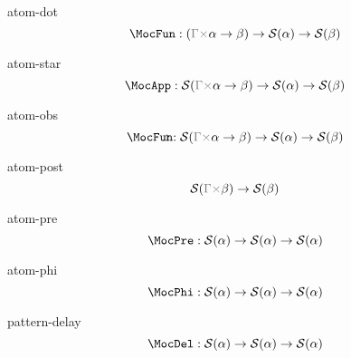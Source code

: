 \documentclass[preview]{standalone}
\def\MocObs{\MocFun\kern-.65em{\scriptstyle\mathbf ?}}
\begin{document}
\begin{docimage}{atom-dot}
  \begin{equation*}%
    \MocFun : (\textcolor{gray}{\Gamma \times} \alpha \rightarrow \beta)
    \rightarrow \mathcal{S}(\alpha) \rightarrow \mathcal{S}(\beta)
  \end{equation*}
\end{docimage} 

\begin{docimage}{atom-star}
  \begin{equation*}%
    \MocApp :
    \mathcal{S}({\textcolor{gray}{\Gamma \times} \alpha \rightarrow \beta})
    \rightarrow \mathcal{S}(\alpha) \rightarrow \mathcal{S}(\beta)
  \end{equation*}
\end{docimage}

\begin{docimage}{atom-obs}
  \begin{equation*}%
    \MocObs :
    \mathcal{S}({\textcolor{gray}{\Gamma \times} \alpha \rightarrow \beta})
    \rightarrow \mathcal{S}(\alpha) \rightarrow \mathcal{S}(\beta)
  \end{equation*}
\end{docimage}

\begin{docimage}{atom-post}
  \begin{equation*}%
    \mathcal{S}({\textcolor{gray}{\Gamma \times} \beta})
    \rightarrow \mathcal{S}(\beta)
  \end{equation*}
\end{docimage}

\begin{docimage}{atom-pre}
  \begin{equation*}%
    \MocPre :
    \mathcal{S}(\alpha) \rightarrow \mathcal{S}(\alpha) \rightarrow \mathcal{S}(\alpha)
  \end{equation*}
\end{docimage}

\begin{docimage}{atom-phi}
  \begin{equation*}%
    \MocPhi :
    \mathcal{S}(\alpha) \rightarrow \mathcal{S}(\alpha) \rightarrow \mathcal{S}(\alpha)
  \end{equation*}
\end{docimage}


\begin{docimage}{pattern-delay}
  \begin{equation*}%
    \MocDel :
    \mathcal{S}(\alpha) \rightarrow \mathcal{S}(\alpha) \rightarrow \mathcal{S}(\alpha)
  \end{equation*}
\end{docimage}
\end{document}
